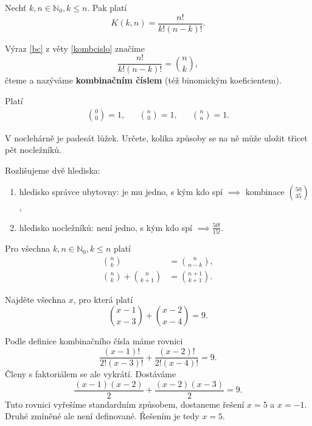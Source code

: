 \begin{veta}\label{kombcislo}
    Nechť $k,n \in \mathbb N_0, k\leq n.$ Pak platí
    \begin{equation}\label{bc}
   K(k,n)=\frac{n!}{k!(n-k)!}.
    \end{equation}
\end{veta}

\begin{definition}
    Výraz \ref{bc} z věty \ref{kombcislo} značíme
    $$\frac{n!}{k!(n-k)!}=\binom{n}{k},$$
    čteme  a nazýváme \textbf{kombinačním číslem} (též binomickým
    koeficientem).
\end{definition}

\begin{pozn}
    Platí
    \begin{align*}
        \binom{0}{0}=1, & & \binom{n}{0}=1, & & \binom{n}{n} = 1.
    \end{align*}
\end{pozn}

\begin{priklad}
V noclehárně je padesát lůžek. Určete, kolika způsoby se na ně může uložit
třicet pět nocležníků.
\end{priklad}

\begin{reseni}
Rozlišujeme dvě hlediska:
\begin{enumerate}[1.]
\item hledisko správce ubytovny: je mu jedno, s kým kdo spí $\implies$ kombinace $\binom{50}{35}$,
\item hledisko nocležníků: není jedno, s kým kdo spí $\implies \frac{50!}{15!}$.
\end{enumerate}
\end{reseni}

\begin{veta}\label{binomvztahy}
    Pro všechna $ k,n \in \mathbb N_0, k\leq n$ platí
    \begin{align*}
        \binom{n}{k} &= \binom{n}{n-k}, \\
        \binom{n}{k} + \binom{n}{k+1} &= \binom{n+1}{k+1}.
    \end{align*}
\end{veta}

\begin{priklad}
Najděte všechna $x$, pro která platí
$$\binom{x-1}{x-3}+\binom{x-2}{x-4}=9.$$
\end{priklad}

\begin{reseni}
    Podle definice kombinačního čísla máme rovnici
    $$
    \frac{(x-1)!}{2!(x-3)!} + \frac{(x-2)!}{2!(x-4)!} = 9.
    $$
    Členy s faktoriálem se ale vykrátí. Dostáváme
    $$
    \frac{(x-1)(x-2)}{2} + \frac{(x-2)(x-3)}{2} = 9.
    $$
    Tuto rovnici vyřešíme standardním způsobem, dostaneme řešení $x = 5$ a $x=-1$. Druhé zmíněné ale není definované.
    Řešením je tedy $x=5$.
\end{reseni}

